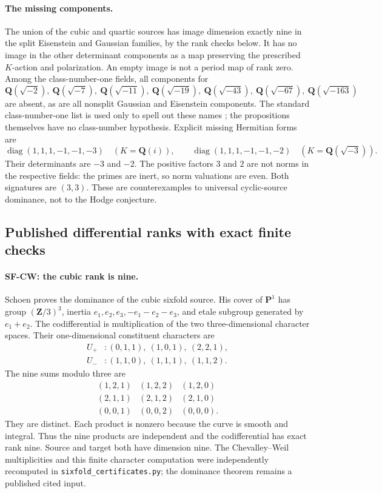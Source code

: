 \paragraph{The missing components.}
The union of the cubic and quartic sources has image dimension exactly
nine in the split Eisenstein and Gaussian families, by the rank checks
below. It has no image in the other determinant components as a map
preserving the prescribed $K$-action and polarization. An empty image
is not a period map of rank zero. Among the class-number-one fields,
all components for
\[
 \mathbf Q(\sqrt{-2}),\ \mathbf Q(\sqrt{-7}),\
 \mathbf Q(\sqrt{-11}),\ \mathbf Q(\sqrt{-19}),\
 \mathbf Q(\sqrt{-43}),\ \mathbf Q(\sqrt{-67}),\
 \mathbf Q(\sqrt{-163})
\]
are absent, as are all nonsplit Gaussian and Eisenstein components.
The standard class-number-one list is used only to spell out these
names \cite[``Class Number 1'']{SF-Stein}; the propositions themselves
have no class-number hypothesis. Explicit missing Hermitian forms are
\[
 \operatorname{diag}(1,1,1,-1,-1,-3)\quad(K=\mathbf Q(i)),
 \qquad
 \operatorname{diag}(1,1,1,-1,-1,-2)\quad(K=\mathbf Q(\sqrt{-3})).
\]
Their determinants are $-3$ and $-2$. The positive factors $3$ and $2$
are not norms in the respective fields: the primes are inert, so norm
valuations are even. Both signatures are $(3,3)$. These are
counterexamples to universal cyclic-source dominance, not to the Hodge
conjecture.

\subsection{Published differential ranks with exact finite checks}
\label{sec:sixfold-ranks}

\paragraph{SF-CW: the cubic rank is nine.}
Schoen \cite[Lemma~13, equations~(13.1)--(13.2), pp.~334--335]{SF-Schoen1998}
proves the dominance of the cubic sixfold source. His cover of
$\mathbf P^1$ has group $(\mathbf Z/3)^3$, inertia
$e_1,e_2,e_3,-e_1-e_2-e_3$, and etale subgroup generated by $e_1+e_2$.
The codifferential is multiplication of the two three-dimensional
character spaces. Their one-dimensional constituent characters are
\[
 \begin{split}
 U_+ &: (0,1,1),\ (1,0,1),\ (2,2,1),\\
 U_- &: (1,1,0),\ (1,1,1),\ (1,1,2).
 \end{split}
\]
The nine sums modulo three are
\[
 \begin{array}{ccc}
 (1,2,1)&(1,2,2)&(1,2,0)\\
 (2,1,1)&(2,1,2)&(2,1,0)\\
 (0,0,1)&(0,0,2)&(0,0,0).
 \end{array}
\]
They are distinct. Each product is nonzero because the curve is smooth
and integral. Thus the nine products are independent and the
codifferential has exact rank nine. Source and target both have
dimension nine. The Chevalley--Weil multiplicities and this finite
character computation were independently recomputed in
\texttt{sixfold\_certificates.py}; the dominance theorem remains a
published cited input.

